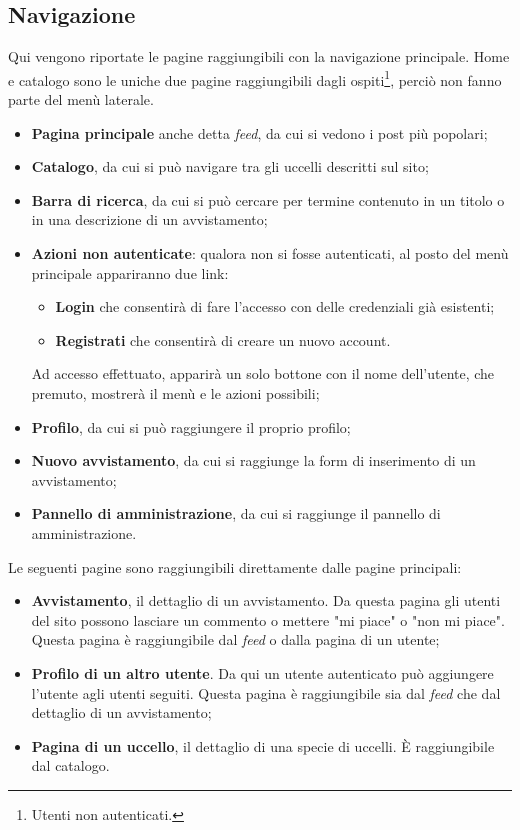 \documentclass[12pt, a4paper]{article}
\begin{document}
    \subsection{Navigazione}
    Qui vengono riportate le pagine raggiungibili con la navigazione principale. Home e catalogo sono le uniche due pagine raggiungibili dagli ospiti\footnote{Utenti non autenticati.}, perciò non fanno parte del menù laterale.
    \begin{itemize}
        \item \textbf{Pagina principale} anche detta \textit{feed}, da cui si vedono i post più popolari;
        \item \textbf{Catalogo}, da cui si può navigare tra gli uccelli descritti sul sito;
        \item \textbf{Barra di ricerca}, da cui si può cercare per termine contenuto in un titolo o in una descrizione di un avvistamento;
        \item \textbf{Azioni non autenticate}: qualora non si fosse autenticati, al posto del menù principale appariranno due link:
        \begin{itemize}
            \item \textbf{Login} che consentirà di fare l'accesso con delle credenziali già esistenti;
            \item \textbf{Registrati} che consentirà di creare un nuovo account.
        \end{itemize}
        Ad accesso effettuato, apparirà un solo bottone con il nome dell'utente, che premuto, mostrerà il menù e le azioni possibili;
        \item \textbf{Profilo}, da cui si può raggiungere il proprio profilo;
        \item \textbf{Nuovo avvistamento}, da cui si raggiunge la form di inserimento di un avvistamento;
        \item \textbf{Pannello di amministrazione}, da cui si raggiunge il pannello di amministrazione.
    \end{itemize}
    Le seguenti pagine sono raggiungibili direttamente dalle pagine principali:
    \begin{itemize}
        \item \textbf{Avvistamento}, il dettaglio di un avvistamento. Da questa pagina gli utenti del sito possono lasciare un commento o mettere "mi piace" o "non mi piace". Questa pagina è raggiungibile dal \textit{feed} o dalla pagina di un utente;
        \item \textbf{Profilo di un altro utente}. Da qui un utente autenticato può aggiungere l'utente agli utenti seguiti. Questa pagina è raggiungibile sia dal \textit{feed} che dal dettaglio di un avvistamento;
        \item \textbf{Pagina di un uccello}, il dettaglio di una specie di uccelli. È raggiungibile dal catalogo.
    \end{itemize}
\end{document}
